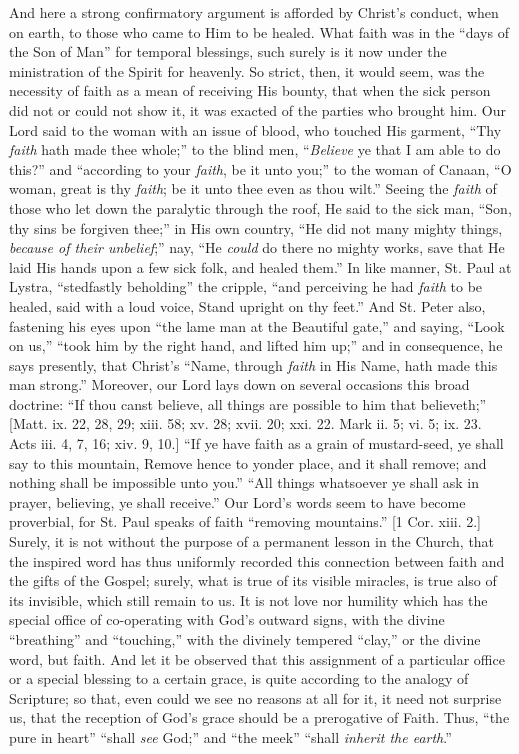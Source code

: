 And here a strong confirmatory argument is afforded by Christ's
conduct, when on earth, to those who came to Him to be healed. What
faith was in the ``days of the Son of Man'' for temporal
blessings, such surely is it now under the ministration of the Spirit
for heavenly. So strict, then, it would seem, was the necessity of
faith as a mean of receiving His bounty, that when the sick person did
not or could not show it, it was exacted of the parties who brought
him. Our Lord said to the woman with an issue of blood, who touched
His garment, ``Thy \emph{faith} hath made thee whole;'' to the
blind men, ``\emph{Believe} ye that I am able to do this?''
and ``according to your \emph{faith}, be it unto you;'' to the
woman of Canaan, ``O woman, great is thy \emph{faith}; be it unto
thee even as thou wilt.'' Seeing the \emph{faith} of those who let
down the paralytic through the roof, He said to the sick man,
``Son, thy sins be forgiven thee;'' in His own country,
``He did not many mighty things, \emph{because of their unbelief};''
nay, ``He \emph{could} do there no mighty works, save that He laid
His hands upon a few sick folk, and healed them.'' In like manner,
St. Paul at Lystra, ``stedfastly beholding'' the cripple,
``and perceiving he had \emph{faith} to be healed, said with
a loud voice, Stand upright on thy feet.'' And St. Peter also,
fastening his eyes upon ``the lame man at the Beautiful
gate,'' and saying, ``Look on us,'' ``took him by the
right hand, and lifted him up;'' and in consequence, he says
presently, that Christ's ``Name, through \emph{faith} in His Name,
hath made this man strong.'' Moreover, our Lord lays down on
several occasions this broad doctrine: ``If thou canst believe,
all things are possible to him that believeth;'' [Matt. ix. 22,
28, 29; xiii. 58; xv. 28; xvii. 20; xxi. 22. Mark ii. 5; vi. 5; ix.
23. Acts iii. 4, 7, 16; xiv. 9, 10.] ``If ye have faith as a grain
of mustard-seed, ye shall say to this mountain, Remove hence to yonder
place, and it shall remove; and nothing shall be impossible unto
you.'' ``All things whatsoever ye shall ask in prayer,
believing, ye shall receive.'' Our Lord's words seem to have
become proverbial, for St. Paul speaks of faith ``removing
mountains.'' [1 Cor. xiii. 2.] Surely, it is not without the
purpose of a permanent lesson in the Church, that the inspired word
has thus uniformly recorded this connection between faith and the
gifts of the Gospel; surely, what is true of its visible miracles, is
true also of its invisible, which still remain to us. It is not love
nor humility which has the special office of co-operating with God's
outward signs, with the divine ``breathing'' and
``touching,'' with the divinely tempered ``clay,'' or
the divine word, but faith. And let it be observed that this
assignment of a particular office or a special blessing to a certain
grace, is quite according to the analogy of Scripture; so that, even
could we see no reasons at all for it, it need not surprise us, that
the reception of God's grace should be a prerogative of Faith.
Thus, ``the pure in heart'' ``shall \emph{see} God;''
and ``the meek'' ``shall \emph{inherit the earth}.''

